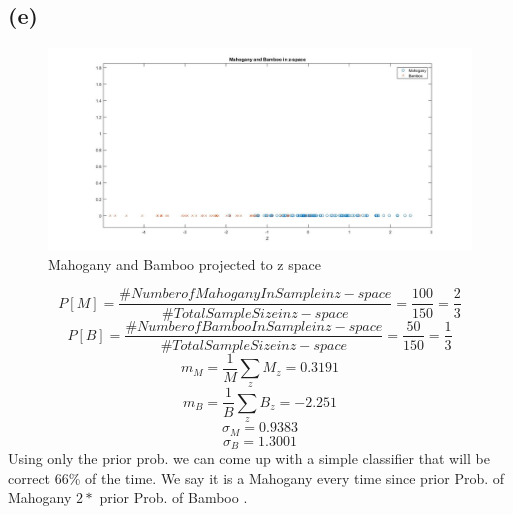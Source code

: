 \documentclass[a4paper,11pt]{article}
\begin{document}
\subsection*{(e)}
\begin{figure}[h]
  \hspace*{-6cm}
   \includegraphics[scale=0.5]{q1_e}
   \caption{Mahogany and Bamboo projected to z space}\label{fig:q1_e}
\end{figure}
$$P[M] = \frac{\#Number of Mahogany In Sample in z-space}{\#Total Sample Size in z-space} = \frac{100}{150}=\frac{2}{3}$$
$$P[B] = \frac{\#Number of Bamboo In Sample in z-space}{\#Total Sample Size in z-space} = \frac{50}{150}=\frac{1}{3}$$
$$m_{M} =\frac{1}{M} \sum_{z}^{}M_z = 0.3191$$
$$m_{B} =\frac{1}{B} \sum_{z}^{}B_z = -2.251$$
$$\sigma_{M} = 0.9383$$
$$\sigma_{B} = 1.3001$$
Using only the prior prob. we can come up with a simple classifier that will be correct 66\% of the time. We say it is a Mahogany every time since prior Prob. of Mahogany $2*$ prior Prob. of Bamboo . 
\end{document}
